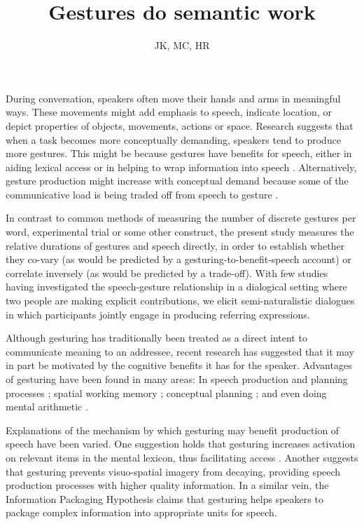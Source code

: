 \documentclass[a4paper,man,natbib]{apa6}
\title{Gestures do semantic work}
\author{JK, MC, HR}
\affiliation{Psychology, PPLS, University of Edinburgh}
\begin{document}
\maketitle

\noindent
During conversation, speakers often move their hands and arms in meaningful ways.
These movements might add emphasis to speech, indicate location, or depict properties of objects, movements, actions or space.
Research suggests that when a task becomes more conceptually demanding, speakers tend to produce more gestures.
This might be because gestures have benefits for speech, either in aiding lexical access \citep{Rauscher1996, Krauss2000} or in helping to wrap information into speech \citep{Kita2000}.
Alternatively, gesture production might increase with conceptual demand because some of the communicative load is being traded off from speech to gesture \citep{Melinger2004, Bangerter2004, DeRuiter2006}.

In contrast to common methods of measuring the number of discrete gestures per word, experimental trial or some other construct, the present study measures the relative durations of gestures and speech directly, in order to establish whether they co-vary (as would be predicted by a gesturing-to-benefit-speech account) or correlate inversely (as would be predicted by a trade-off).
With few studies having investigated the speech-gesture relationship in a dialogical setting where two people are making explicit contributions, we elicit semi-naturalistic dialogues in which participants jointly engage in producing referring expressions.

Although gesturing has traditionally been treated as a direct intent to communicate meaning to an addressee, recent research has suggested that it may in part be motivated by the cognitive benefits it has for the speaker.
Advantages of gesturing have been found in many areas: In speech production and planning processes \citep{Rauscher1996, Krauss1999, Rose2001, Morsella2004, Kita2000}; spatial working memory \citep{Wesp2001, Morsella2004}; conceptual planning \citep{Melinger2007}; and even doing mental arithmetic \citep{Goldin-Meadow2001}.

Explanations of the mechanism by which gesturing may benefit production of speech have been varied. 
One suggestion holds that gesturing increases activation on relevant items in the mental lexicon, thus facilitating access \citep{Krauss2000}. 
Another \citep{Hadar1997} suggests that gesturing prevents visuo-spatial imagery from decaying, providing speech production processes with higher quality information. 
In a similar vein, the Information Packaging Hypothesis \citep{Kita2000, Kita2003} claims that gesturing helps speakers to package complex information into appropriate units for speech. 
\end{document}
